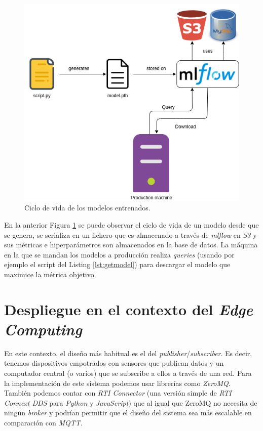 \begin{figure}[H]
  \centering
  \includegraphics[width=.8\linewidth]{imagenes/07_Despliegue/ModelLifecycle.png} 
  \caption{Ciclo de vida de los modelos entrenados.}
  \label{fig:modellifecycle}
\end{figure}

En la anterior Figura \ref{fig:modellifecycle} se puede observar el ciclo de vida de un modelo desde que se genera, se serializa en un fichero que es almacenado a través de \textit{mlflow} en \textit{S3} y sus métricas e hiperparámetros son almacenados en la base de datos. La máquina en la que se mandan los modelos a producción realiza \textit{queries} (usando por ejemplo el script del Listing \ref{lst:getmodel}) para descargar el modelo que maximice la métrica objetivo.

\section{Despliegue en el contexto del \textit{Edge Computing}}

En este contexto, el diseño más habitual es el del \textit{publisher}/\textit{subscriber}. Es decir, tenemos dispositivos empotrados con sensores que publican datos y un computador central (o varios) que se subscribe a ellos a través de una red. Para la implementación de este sistema podemos usar librerías como \textit{ZeroMQ}. También podemos contar con \textit{RTI Connector} \cite{rticonnector} (una versión simple de \textit{RTI Connext DDS} para \textit{Python} y \textit{JavaScript}) que al igual que ZeroMQ no necesita de ningún \textit{broker} y podrían permitir que el diseño del sistema sea más escalable en comparación con \textit{MQTT}.\\

